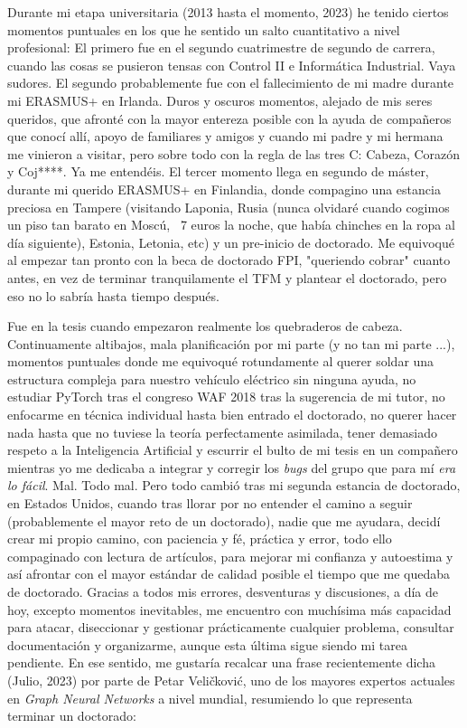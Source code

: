 Durante mi etapa universitaria (2013 hasta el momento, 2023) he tenido ciertos momentos puntuales en los que he sentido un salto cuantitativo a nivel profesional: El primero fue en el segundo cuatrimestre de segundo de carrera, cuando las cosas se pusieron tensas con Control II e Informática Industrial. Vaya sudores. El segundo probablemente fue con el fallecimiento de mi madre durante mi ERASMUS+ en Irlanda. Duros y oscuros momentos, alejado de mis seres queridos, que afronté con la mayor entereza posible con la ayuda de compañeros que conocí allí, apoyo de familiares y amigos y cuando mi padre y mi hermana me vinieron a visitar, pero sobre todo con la regla de las tres C: Cabeza, Corazón y Coj****. Ya me entendéis. El tercer momento llega en segundo de máster, durante mi querido ERASMUS+ en Finlandia, donde compagino una estancia preciosa en Tampere (visitando Laponia, Rusia (nunca olvidaré cuando cogimos un piso tan barato en Moscú, \ie \ 7 euros la noche, que había chinches en la ropa al día siguiente), Estonia, Letonia, etc) y un pre-inicio de doctorado. Me equivoqué al empezar tan pronto con la beca de doctorado FPI, "queriendo cobrar" cuanto antes, en vez de terminar tranquilamente el TFM y plantear el doctorado, pero eso no lo sabría hasta tiempo después. 

Fue en la tesis cuando empezaron realmente los quebraderos de cabeza. Continuamente altibajos, mala planificación por mi parte (y no tan mi parte ...), momentos puntuales donde me equivoqué rotundamente al querer soldar una estructura compleja para nuestro vehículo eléctrico sin ninguna ayuda, no estudiar PyTorch tras el congreso WAF 2018 tras la sugerencia de mi tutor, no enfocarme en técnica individual hasta bien entrado el doctorado, no querer hacer nada hasta que no tuviese la teoría perfectamente asimilada, tener demasiado respeto a la Inteligencia Artificial y escurrir el bulto de mi tesis en un compañero mientras yo me dedicaba a integrar y corregir los \textit{bugs} del grupo que para mí \textit{era lo fácil}. Mal. Todo mal. Pero todo cambió tras mi segunda estancia de doctorado, en Estados Unidos, cuando tras llorar por no entender el camino a seguir (probablemente el mayor reto de un doctorado), nadie que me ayudara, decidí crear mi propio camino, con paciencia y fé, práctica y error, todo ello compaginado con lectura de artículos, para mejorar mi confianza y autoestima y así afrontar con el mayor estándar de calidad posible el tiempo que me quedaba de doctorado. Gracias a todos mis errores, desventuras y discusiones, a día de hoy, excepto momentos inevitables, me encuentro con muchísima más capacidad para atacar, diseccionar y gestionar prácticamente cualquier problema, consultar documentación y organizarme, aunque esta última sigue siendo mi tarea pendiente. En ese sentido, me gustaría recalcar una frase recientemente dicha (Julio, 2023) por parte de Petar Veličković, uno de los mayores expertos actuales en \textit{Graph Neural Networks} a nivel mundial, resumiendo lo que representa terminar un doctorado:

